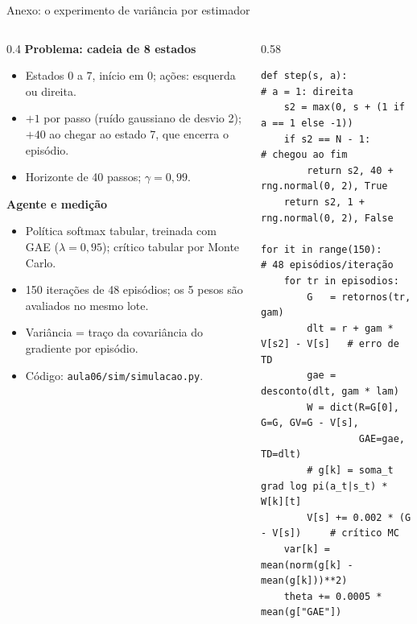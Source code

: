 \documentclass[aspectratio=169, 11pt]{beamer}
\begin{document}
\begin{frame}[fragile]{Anexo: o experimento de variância por estimador}
  \begin{columns}[T]
    \begin{column}{0.4\textwidth}
      \scriptsize
      \textbf{\color{rlAzul}Problema: cadeia de 8 estados}
      \begin{itemize}\setlength{\itemsep}{0pt}
        \item Estados 0 a 7, início em 0; ações: esquerda ou direita.
        \item $+1$ por passo (ruído gaussiano de desvio 2); $+40$ ao chegar ao estado 7, que encerra o episódio.
        \item Horizonte de 40 passos; $\gamma = 0{,}99$.
      \end{itemize}
      \textbf{\color{rlAzul}Agente e medição}
      \begin{itemize}\setlength{\itemsep}{0pt}
        \item Política softmax tabular, treinada com GAE ($\lambda = 0{,}95$); crítico tabular por Monte Carlo.
        \item 150 iterações de 48 episódios; os 5 pesos são avaliados no mesmo lote.
        \item Variância = traço da covariância do gradiente por episódio.
        \item Código: \texttt{aula06/sim/simulacao.py}.
      \end{itemize}
    \end{column}
    \begin{column}{0.58\textwidth}
\fontsize{6.5}{7.6}\selectfont
\begin{verbatim}
def step(s, a):              # a = 1: direita
    s2 = max(0, s + (1 if a == 1 else -1))
    if s2 == N - 1:          # chegou ao fim
        return s2, 40 + rng.normal(0, 2), True
    return s2, 1 + rng.normal(0, 2), False

for it in range(150):        # 48 episódios/iteração
    for tr in episodios:
        G   = retornos(tr, gam)
        dlt = r + gam * V[s2] - V[s]   # erro de TD
        gae = desconto(dlt, gam * lam)
        W = dict(R=G[0], G=G, GV=G - V[s],
                 GAE=gae, TD=dlt)
        # g[k] = soma_t grad log pi(a_t|s_t) * W[k][t]
        V[s] += 0.002 * (G - V[s])     # crítico MC
    var[k] = mean(norm(g[k] - mean(g[k]))**2)
    theta += 0.0005 * mean(g["GAE"])
\end{verbatim}
    \end{column}
  \end{columns}
\end{frame}
\end{document}
